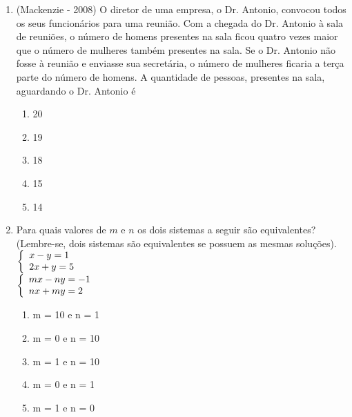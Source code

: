 \documentclass[a4paper,12pt]{article}
\begin{document}
\begin{enumerate}
  
    \item (Mackenzie - 2008) O diretor de uma empresa, o Dr. Antonio, convocou todos os seus funcionários para uma reunião. Com a chegada do Dr. Antonio à sala de reuniões, o número de homens presentes na sala ficou quatro vezes maior que o número de mulheres também presentes na sala. Se o Dr. Antonio não fosse à reunião e enviasse sua secretária, o número de mulheres ficaria a terça parte do número de homens. A quantidade de pessoas, presentes na sala, aguardando o Dr. Antonio é
     \begin{enumerate}
    	\item 20
		\item 19
		\item 18
		\item 15
        \item 14
		\end{enumerate}
    
      
   
    \item Para quais valores de $m$ e $n$ os dois sistemas a seguir são equivalentes? (Lembre-se, dois sistemas são equivalentes se possuem as mesmas soluções). \\
    $ 
\left\{
\begin{array}{ll}
\displaystyle x - y = 1 \\
\displaystyle 2x + y = 5\\
\end{array}
\right.\\
$
   \\
   
   $ 
\left\{
\begin{array}{ll}
\displaystyle mx -ny = -1 \\
\displaystyle nx + my = 2\\
\end{array}
\right.\\
$
   \\
    \begin{enumerate}
        \item m = 10 e n = 1
    	\item m = 0 e n = 10
		\item m = 1 e n = 10
		\item m = 0 e n = 1
        \item m = 1 e n = 0
		\end{enumerate}
        
    
    

\end{enumerate}
\end{document}
